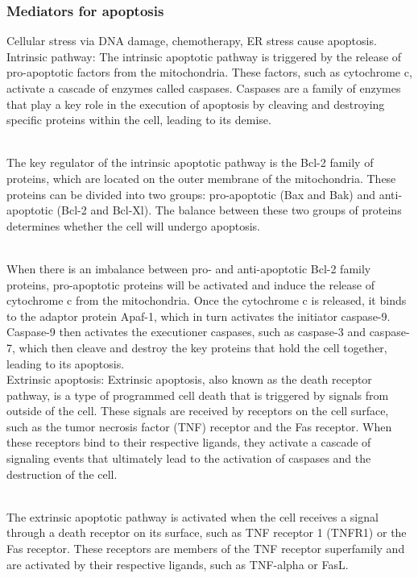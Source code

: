 \begin{itemize}
\begin{itemize}
\subsubsection{Mediators for apoptosis}
Cellular stress via DNA damage, chemotherapy, ER stress cause apoptosis.
\\Intrinsic pathway: The intrinsic apoptotic pathway is triggered by the release of pro-apoptotic factors from the mitochondria. These factors, such as cytochrome c, activate a cascade of enzymes called caspases. Caspases are a family of enzymes that play a key role in the execution of apoptosis by cleaving and destroying specific proteins within the cell, leading to its demise.

\\The key regulator of the intrinsic apoptotic pathway is the Bcl-2 family of proteins, which are located on the outer membrane of the mitochondria. These proteins can be divided into two groups: pro-apoptotic (Bax and Bak) and anti-apoptotic (Bcl-2 and Bcl-Xl). The balance between these two groups of proteins determines whether the cell will undergo apoptosis.

\\When there is an imbalance between pro- and anti-apoptotic Bcl-2 family proteins, pro-apoptotic proteins will be activated and induce the release of cytochrome c from the mitochondria. Once the cytochrome c is released, it binds to the adaptor protein Apaf-1, which in turn activates the initiator caspase-9. Caspase-9 then activates the executioner caspases, such as caspase-3 and caspase-7, which then cleave and destroy the key proteins that hold the cell together, leading to its apoptosis.
\\Extrinsic apoptosis: Extrinsic apoptosis, also known as the death receptor pathway, is a type of programmed cell death that is triggered by signals from outside of the cell. These signals are received by receptors on the cell surface, such as the tumor necrosis factor (TNF) receptor and the Fas receptor. When these receptors bind to their respective ligands, they activate a cascade of signaling events that ultimately lead to the activation of caspases and the destruction of the cell.

\\The extrinsic apoptotic pathway is activated when the cell receives a signal through a death receptor on its surface, such as TNF receptor 1 (TNFR1) or the Fas receptor. These receptors are members of the TNF receptor superfamily and are activated by their respective ligands, such as TNF-alpha or FasL.


\end{itemize}
\end{itemize}
